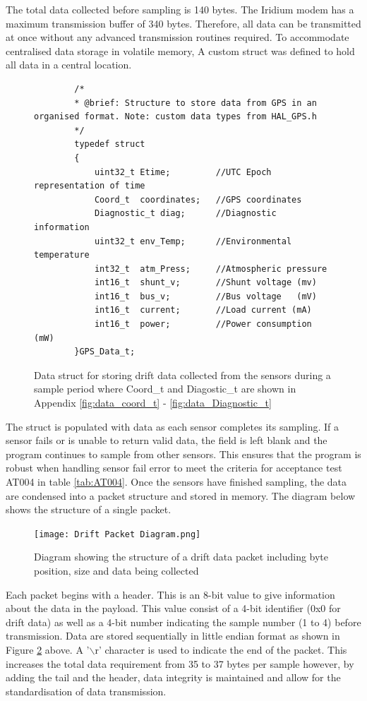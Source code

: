 The total data collected before sampling is 140 bytes. The Iridium modem has a maximum transmission buffer of 340 bytes. Therefore, all data can be transmitted at once without any advanced transmission routines required. To accommodate centralised data storage in volatile memory, A custom struct was defined to hold all data in a central location.

\begin{figure}[H]
	\centering
	\begin{lstlisting}
		/*
		* @brief: Structure to store data from GPS in an organised format. Note: custom data types from HAL_GPS.h
		*/
		typedef struct
		{
			uint32_t Etime;			//UTC Epoch representation of time
			Coord_t  coordinates;	//GPS coordinates
			Diagnostic_t diag;		//Diagnostic information
			uint32_t env_Temp;		//Environmental temperature
			int32_t  atm_Press;		//Atmospheric pressure
			int16_t  shunt_v;       //Shunt voltage (mv)
			int16_t  bus_v;			//Bus voltage   (mV)
			int16_t  current;       //Load current (mA)
			int16_t  power;			//Power consumption (mW)
		}GPS_Data_t;
	\end{lstlisting}
	\caption{Data struct for storing drift data collected from the sensors during a sample period where Coord\_t and Diagostic\_t are shown in Appendix \ref{fig:data_coord_t} - \ref{fig:data_Diagnostic_t}} 
	\label{fig:data_drift_struct}
\end{figure}

The struct is populated with data as each sensor completes its sampling. If a sensor fails or is unable to return valid data, the field is left blank and the program continues to sample from other sensors. This ensures that the program is robust when handling sensor fail error to meet the criteria for acceptance test AT004 in table \ref{tab:AT004}. Once the sensors have finished sampling, the data are condensed into a packet structure and stored in memory. The diagram below shows the structure of a single packet.

\begin{figure}[H]
	\centering
	\texttt{[image: Drift Packet Diagram.png]}
	\caption{Diagram showing the structure of a drift data packet including byte position, size and data being collected}
	\label{fig:packet_structure}
\end{figure}

Each packet begins with a header. This is an 8-bit value to give information about the data in the payload. This value consist of a 4-bit identifier (0x0 for drift data) as well as a 4-bit number indicating the sample number (1 to 4) before transmission. Data are stored sequentially in little endian format as shown in Figure \ref{fig:packet_structure} above. A '$\backslash$r' character is used to indicate the end of the packet. This increases the total data requirement from 35 to 37 bytes per sample however, by adding the tail and the header, data integrity is maintained and allow for the standardisation of data transmission.\par  

